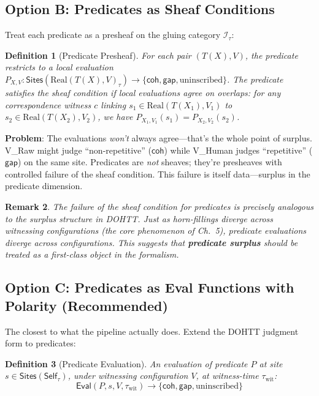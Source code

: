 \documentclass[11pt,a4paper]{article}
\newtheorem{definition}{Definition}[section]
\newtheorem{remark}[definition]{Remark}
\newcommand{\Self}{\mathsf{Self}}
\newcommand{\coh}{\mathsf{coh}}
\newcommand{\gap}{\mathsf{gap}}
\newcommand{\Eval}{\mathsf{Eval}}
\newcommand{\Sites}{\mathsf{Sites}}
\begin{document}
\subsection{Option B: Predicates as Sheaf Conditions}

Treat each predicate as a presheaf on the gluing category $\mathcal{I}_\tau$:

\begin{definition}[Predicate Presheaf]
For each pair $(T(X), V)$, the predicate restricts to a local evaluation
$P_{X,V} : \Sites(\text{Real}(T(X), V)_\tau) \to \{\coh, \gap, \text{uninscribed}\}$.
The predicate satisfies the \emph{sheaf condition} if local evaluations agree on
overlaps: for any correspondence witness $c$ linking $s_1 \in \text{Real}(T(X_1), V_1)$
to $s_2 \in \text{Real}(T(X_2), V_2)$, we have $P_{X_1, V_1}(s_1) = P_{X_2, V_2}(s_2)$.
\end{definition}

\textbf{Problem}: The evaluations \emph{won't} always agree---that's the whole
point of surplus. V\_Raw might judge ``non-repetitive'' ($\coh$) while V\_Human
judges ``repetitive'' ($\gap$) on the same site. Predicates are \emph{not} sheaves;
they're presheaves with controlled failure of the sheaf condition. This failure is
itself data---surplus in the predicate dimension.

\begin{remark}
The failure of the sheaf condition for predicates is \emph{precisely analogous}
to the surplus structure in DOHTT. Just as horn-fillings diverge across witnessing
configurations (the core phenomenon of Ch.~5), predicate evaluations diverge across
configurations. This suggests that \textbf{predicate surplus} should be treated as
a first-class object in the formalism.
\end{remark}

\subsection{Option C: Predicates as Eval Functions with Polarity (Recommended)}

The closest to what the pipeline actually does. Extend the DOHTT judgment form to
predicates:

\begin{definition}[Predicate Evaluation]
\label{def:pred-eval}
An evaluation of predicate $P$ at site $s \in \Sites(\Self_\tau)$, under witnessing
configuration $V$, at witness-time $\tau_{\text{wit}}$:
\begin{equation}
  \Eval(P, s, V, \tau_{\text{wit}}) \to \{\coh, \gap, \text{uninscribed}\}
\end{equation}
\end{definition}
\end{document}

